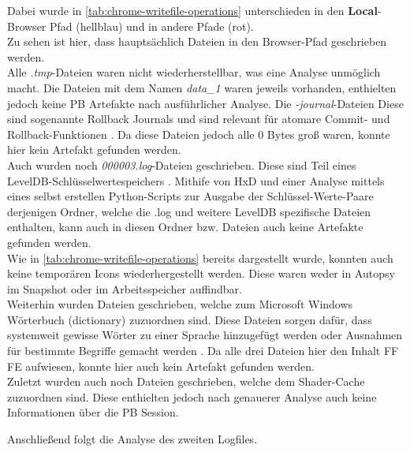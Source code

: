 \begin{appendices}
{\begin{landscape}
\begin{table}[h!]
{\begin{tabular}{cllll}
				\end{tabular}
}
\end{table}
\end{landscape}
}
\restoregeometry
\begin{sloppypar}
Dabei wurde in \autoref{tab:chrome-writefile-operations} unterschieden in den \textbf{Local}-Browser Pfad (hellblau) und in andere Pfade (rot).\\
Zu sehen ist hier, dass hauptsächlich Dateien in den Browser-Pfad geschrieben werden.\\
Alle \textit{.tmp}-Dateien waren nicht wiederherstellbar, was eine Analyse unmöglich macht. Die Dateien mit dem Namen \textit{data\_1} waren jeweils vorhanden, enthielten jedoch keine PB Artefakte nach ausführlicher Analyse. Die \textit{-journal}-Dateien Diese sind sogenannte \glqq{}Rollback Journals\grqq{} und sind relevant für atomare Commit- und Rollback-Funktionen \cite{SQLiteTempfiles}. Da diese Dateien jedoch alle 0 Bytes groß waren, konnte hier kein Artefakt gefunden werden.\\
Auch wurden noch \textit{000003.log}-Dateien geschrieben. Diese sind Teil eines LevelDB-Schlüsselwertespeichers \cite{LevelDBGithub,LevelDBCCL} . Mithife von HxD und einer Analyse mittels eines selbst erstellen Python-Scripts zur Ausgabe der Schlüssel-Werte-Paare derjenigen Ordner, welche die .log und weitere LevelDB spezifische Dateien enthalten, kann auch in diesen Ordner bzw. Dateien auch keine Artefakte gefunden werden.\\
Wie in \autoref{tab:chrome-writefile-operations} bereits dargestellt wurde, konnten auch keine temporären Icons wiederhergestellt werden. Diese waren weder in Autopsy im Snapshot oder im Arbeitsspeicher auffindbar. \\
Weiterhin wurden Dateien geschrieben, welche zum Microsoft Windows Wörterbuch (dictionary) zuzuordnen sind. Diese Dateien sorgen dafür, dass systemweit gewisse Wörter zu einer Sprache hinzugefügt werden oder Ausnahmen für bestimmte Begriffe gemacht werden \cite{DictionaryWin10Files}. Da alle drei Dateien hier den Inhalt \glqq{}FF FE\grqq{} aufwiesen, konnte hier auch kein Artefakt gefunden werden.\\
Zuletzt wurden auch noch Dateien geschrieben, welche dem Shader-Cache zuzuordnen sind. Diese enthielten jedoch nach genauerer Analyse auch keine Informationen über die PB Session.\end{sloppypar}

Anschließend folgt die Analyse des zweiten Logfiles.


\end{appendices}
